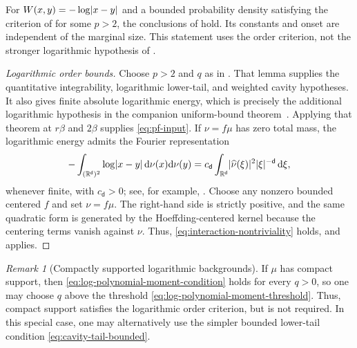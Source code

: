 \documentclass[11pt,reqno]{amsart}
\numberwithin{equation}{section}
\theoremstyle{plain}
\theoremstyle{remark}
\newtheorem{remark}[remark]{Remark}
\DeclarePairedDelimiter{\abs}{\lvert}{\rvert}
\renewcommand{\d}{\mathsf{d}}
\newcommand{\md}{\mathrm{d}}
\newcommand{\R}{{\mathbb{R}}}
\newcommand{\be}{\beta}
\begin{document}
For $W(x,y)=-\log\abs{x-y}$ and a bounded probability density satisfying the criterion of  for some $p>2$, the conclusions of  hold.  Its constants and onset are independent of the marginal size.  This statement uses the order criterion, not the stronger logarithmic hypothesis of .

\begin{proof}[Logarithmic order bounds]
Choose \(p>2\) and \(q\) as in .  That lemma supplies the quantitative integrability, logarithmic lower-tail, and weighted cavity hypotheses.  It also gives finite absolute logarithmic energy, which is precisely the additional logarithmic hypothesis in the companion uniform-bound theorem~\cite[Theorem~2.2\textup{(i)}]{DGR26}.  Applying that theorem at \(r\be\) and \(2\be\) supplies \eqref{eq:pf-input}.  If \(\nu=f\mu\) has zero total mass, the logarithmic energy admits the Fourier representation
\begin{align}\label{eq:log-zero-mass-fourier}
 -\int_{(\R^\d)^2}\log\abs{x-y}\,\md\nu(x)\md\nu(y)
 =c_\d\int_{\R^\d}\abs{\widehat\nu(\xi)}^2\abs{\xi}^{-\d}\,\md\xi,
\end{align}
whenever finite, with \(c_\d>0\); see, for example, \cite[Chapter~4, Section~4.1]{SerfatyLN}.  Choose any nonzero bounded centered \(f\) and set \(\nu=f\mu\).  The right-hand side is strictly positive, and the same quadratic form is generated by the Hoeffding-centered kernel because the centering terms vanish against \(\nu\).  Thus, \eqref{eq:interaction-nontriviality} holds, and  applies.
\end{proof}

\begin{remark}[Compactly supported logarithmic backgrounds]
If \(\mu\) has compact support, then \eqref{eq:log-polynomial-moment-condition} holds for every \(q>0\), so one may choose \(q\) above the threshold \eqref{eq:log-polynomial-moment-threshold}.  Thus, compact support satisfies the logarithmic order criterion, but is not required.  In this special case, one may alternatively use the simpler bounded lower-tail condition \eqref{eq:cavity-tail-bounded}.
\end{remark}
\end{document}
